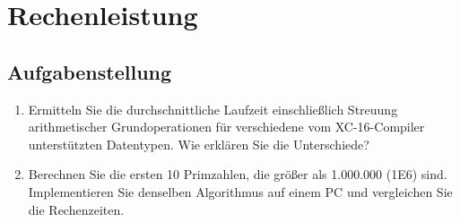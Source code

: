 \section{Rechenleistung}
\subsection{Aufgabenstellung}

\begin{enumerate}%
		\item Ermitteln Sie die durchschnittliche Laufzeit einschließlich Streuung arithmetischer Grundoperationen für verschiedene vom XC-16-Compiler unterstützten Datentypen. Wie erklären Sie die Unterschiede?
		\item Berechnen Sie die ersten 10 Primzahlen, die größer als 1.000.000 (1E6) sind. Implementieren Sie denselben Algorithmus auf einem PC und vergleichen Sie die Rechenzeiten.
		
\end{enumerate}

